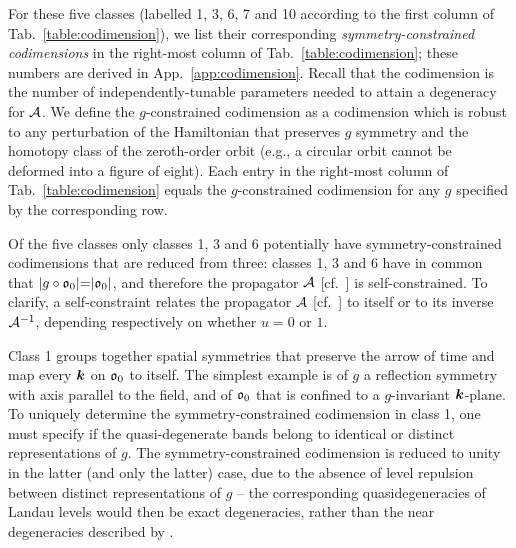 \documentclass[aps, prb, showpacs, twocolumn, notitlepage, superscriptaddress]{revtex4-1}
\begin{document}



For these five classes (labelled 1, 3, 6, 7 and 10 according to the first column of Tab.\ \ref{table:codimension}), we list their corresponding \textit{symmetry-constrained codimensions} in the right-most column of Tab.\ \ref{table:codimension}; these numbers are derived in  App.\ \ref{app:codimension}. Recall that the codimension is the number of independently-tunable parameters needed to attain a degeneracy for ${\cal A}$. We define the $g$-constrained codimension as a codimension which is robust to any perturbation of the Hamiltonian that preserves $g$ symmetry and the homotopy class\cite{100p} of the zeroth-order orbit (e.g., a circular orbit cannot be deformed into a figure of eight). Each entry in the right-most column of Tab.\ \ref{table:codimension} equals the $g$-constrained codimension for any $g$ specified by the corresponding row.


Of the five classes only classes 1, 3 and 6 potentially have symmetry-constrained codimensions that are reduced from three: classes 1, 3 and 6 have in common that  $|g\circ\mathfrak{o}_0|{=}|\mathfrak{o}_0|$, and therefore the propagator ${\cal A}$ [cf.\ ] is self-constrained. To clarify, a self-constraint relates  the propagator ${\cal A}$ [cf.\ ] to itself or to its inverse ${\cal A}^{-1}$, depending respectively on whether $u{=}0$ or $1$.  


Class 1 groups together  spatial symmetries that preserve the arrow of time and map every $\boldsymbol{k}$ on $\mathfrak{o}_0$ to itself. The simplest example is of $g$  a reflection symmetry with axis parallel to the field, and of  $\mathfrak{o}_0$ that is confined to a $g$-invariant $\boldsymbol{k}$-plane. To uniquely determine the symmetry-constrained codimension in class 1, one must specify if the quasi-degenerate bands belong to identical or distinct representations of $g$.  The symmetry-constrained codimension is reduced to unity in the latter (and only the latter) case, due to the absence of level repulsion between distinct representations of $g$ -- the corresponding quasidegeneracies of Landau levels would then be exact degeneracies, rather than the near degeneracies described by .   
\end{document}

